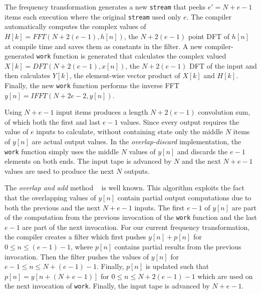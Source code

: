 The frequency transformation generates a new {\tt stream} that
peeks $e'=N+e-1$ items each execution where the original {\tt stream} used only $e$.
The compiler automatically computes the complex values of
$H[k]=FFT(N+2(e-1),h[n])$, the $N+2(e-1)$ point DFT of $h[n]$ at compile
time and saves them as constants in the filter.
A new compiler-generated {\tt work} function is generated that calculates the complex 
valued $X[k]=DFT(N+2(e-1),x[n])$, the $N+2(e-1)$ DFT of the input and 
then calculates $Y[k]$, the element-wise vector product 
of $X[k]$ and $H[k]$. Finally, the new {\tt work} function performs
the inverse FFT $y[n]=IFFT(N+2e-2,y[n])$.

Using $N+e-1$ input items produces a length $N+2(e-1)$ convolution sum, 
of which both the first and last $e-1$ values. Since every output requires 
the value of $e$ inputs to calculate, without containing state 
only the middle $N$ items of $y[n]$ are actual output values. 
In the {\it overlap-discard} implementation, the {\tt work} function simply
uses the middle $N$ values of $y[n]$ and discards the 
$e-1$ elements on both ends. The input tape is advanced by $N$ and the next 
$N+e-1$ values are used to produce the next $N$ outputs.

The {\it overlap and add} method ~\cite{oppenheim-discrete} is well known.
This algorithm exploits the fact that the overlapping values of $y[n]$ contain partial
output computations due to both the previous and the next $N+e-1$ inputs.
The first $e-1$ of $y[n]$ are part of the computation from the previous invocation of the 
{\tt work} function and the last $e-1$ are part of the next invocation. 
For our current frequency transformation, the compiler creates a filter which first pushes 
$y[n]+p[n]$ for $0 \le n \le (e-1)-1$, where $p[n]$ contains partial results from the 
previous invocation. Then the filter pushes the values of $y[n]$ for $e-1 \le n \le N+(e-1)-1$.
Finally, $p[n]$ is updated such that $p[n]=y[n+(N+e-1)]$ for 
$0 \le n \le N+2(e-1)-1$ which are used on the next invocation of {\tt work}.
Finally, the input tape is advanced by $N+e-1$.


